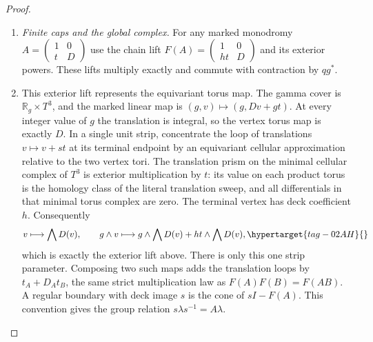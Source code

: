\documentclass[11pt,a4paper]{article}
\numberwithin{equation}{section}
\theoremstyle{definition}
\begin{document}
\begin{proof}
\begin{enumerate}[label=\arabic*.,leftmargin=*]
\item \emph{Finite caps and the global complex.}
For any marked monodromy
$A=\left(\begin{smallmatrix}1&0\\t&D\end{smallmatrix}\right)$
use the chain lift
$F(A)=\left(\begin{smallmatrix}1&0\\ht&D\end{smallmatrix}\right)$
and its exterior powers. These lifts multiply exactly
and commute with contraction by $qg^*$.

\item This exterior lift represents the equivariant
torus map. The gamma cover is
$\mathbb R_g\times T^3$, and the marked linear map is
$(g,v)\mapsto(g,Dv+gt)$. At every integer value of $g$
the translation is integral, so the vertex torus map
is exactly $D$. In a single unit strip, concentrate
the loop of translations $v\mapsto v+st$ at its
terminal endpoint by an equivariant cellular
approximation relative to the two vertex tori.
The translation prism on the minimal cellular complex
of $T^3$ is exterior multiplication by $t$: its value
on each product torus is the homology class of the
literal translation sweep, and all differentials
in that minimal torus complex are zero. The terminal
vertex has deck coefficient $h$. Consequently
\begin{equation}
 v\longmapsto\bigwedge D(v),\qquad
 g\wedge v\longmapsto
 g\wedge\bigwedge D(v)+ht\wedge\bigwedge D(v),
 \hypertarget{tag-02AH}{}\label{maps:eq:E.C20}
\end{equation}
which is exactly the exterior lift above. There is
only this one strip parameter. Composing two such
maps adds the translation loops by
$t_A+D_At_B$, the same strict multiplication law
as $F(A)F(B)=F(AB)$. 
A regular
boundary with deck image $s$ is the cone of $sI-F(A)$.
This convention gives the group relation
$s\lambda s^{-1}=A\lambda$.


\end{enumerate}
\end{proof}
\end{document}
